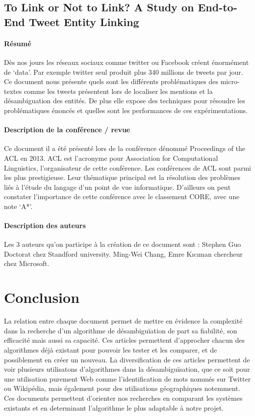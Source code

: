 \documentclass{article}
\begin{document}
\subsection{To Link or Not to Link? A Study on End-to-End Tweet Entity Linking \cite{article-15}}

\paragraph{Résumé}
Dès nos jours les réseaux sociaux comme twitter ou Facebook créent énormément de ‘data’. Par exemple twitter seul produit plus 340 millions de tweets par jour. Ce document nous présente quels sont les différents problématiques des micro-textes comme les tweets présentent lors de localiser les mentions et la désambiguation des entités. De plus elle expose des techniques pour résoudre les problématiques énoncés et quelles sont les performances de ces expérimentations.


\paragraph{Description de la conférence / revue}
Ce document il a été présenté lors de la conférence dénommé Proceedings of the ACL en 2013. ACL est l’acronyme pour Association for Computational Linguistics, l’organisateur de cette conférence.
Les conférences de ACL sont parmi les plus prestigieuse. Leur thématique principal est la résolution des problèmes liés à l’étude du langage d’un point de vue informatique. 
D’ailleurs on peut constater l’importance de cette conférence avec le classement CORE, avec une note ‘A*’.


\paragraph{Description des auteurs}
Les 3 auteurs qu’on participe à la création de ce document sont :
Stephen Guo Doctorat chez Standford university.
Ming-Wei Chang, Emre Kıcıman chercheur chez Microsoft. 




\section{Conclusion}

La relation entre chaque document permet de mettre en évidence la complexité dans la recherche d'un algorithme de désambiguïation de part sa fiabilité, son efficacité mais aussi sa capacité. Ces articles permettent d'approcher chacun des algorithmes déjà existant pour pouvoir les tester et les comparer, et de possiblement en créer un nouveau. La diversification de ces articles permettent de voir plusieurs utilisatons d'algorithmes dans la désambiguïsation, que ce soit pour une utilisation purement Web comme l'identification de mots nommés sur Twitter ou Wikipédia, mais également pour des utilisations géographiques notemment. Ces documents permettent d'orienter nos recherches en comparant les systèmes existants et en determinant l'algorithme le plus adaptable à notre projet.






\end{document}

